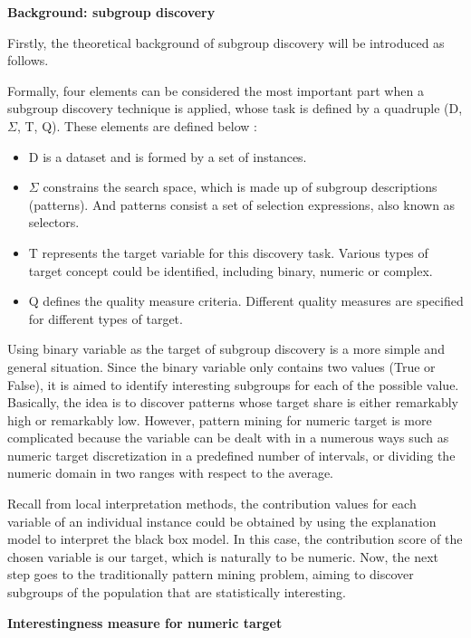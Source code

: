 \textbf{Background: subgroup discovery}

Firstly, the theoretical background of subgroup discovery will be introduced as follows. 

Formally, four elements can be considered the most important part when a subgroup discovery technique is applied, whose task is defined by a quadruple (D, $\Sigma$, T, Q). These elements are defined below \cite{atzmueller2004towards} \cite{lemmerich2014novel}: 

\begin{itemize}
	\item D is a dataset and is formed by a set of instances. 
	\item $\Sigma$ constrains the search space, which is made up of subgroup descriptions (patterns). And patterns consist a set of selection expressions, also known as selectors.
	\item T represents the target variable for this discovery task. Various types of target concept could be identified, including binary, numeric or complex. 
	\item Q defines the quality measure criteria. Different quality measures are specified for different types of target. 
\end{itemize}

Using binary variable as the target of subgroup discovery is a more simple and general situation. Since the binary variable only contains two values (True or False), it is aimed to identify interesting subgroups for each of the possible value. Basically, the idea is to discover patterns whose target share is either remarkably high or remarkably low. However, pattern mining for numeric target is more complicated because the variable can be dealt with in a numerous ways such as numeric target discretization in a predefined number of intervals, or dividing the numeric domain in two ranges with respect to the average. 

Recall from local interpretation methods, the contribution values for each variable of an individual instance could be obtained by using the explanation model to interpret the black box model. In this case, the contribution score of the chosen variable is our target, which is naturally to be numeric. Now, the next step goes to the traditionally pattern mining problem, aiming to discover subgroups of the population that are statistically interesting. 

\textbf{Interestingness measure for numeric target}


